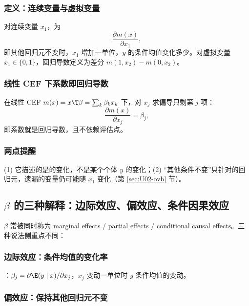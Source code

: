 \subsubsection{定义：连续变量与虚拟变量}

\begin{defn}[回归导数]\label{def:U02-deriv}
对连续变量 $x_1$，为
\[
\frac{\partial m(x)}{\partial x_1},
\]
即其他回归元不变时，$x_1$ 增加一单位，$y$ 的条件均值变化多少。对虚拟变量 $x_1\in\{0,1\}$，回归导数定义为差分 $m(1,x_2)-m(0,x_2)$。
\end{defn}

\subsubsection{线性 CEF 下系数即回归导数}

在线性 CEF $m(x)=x\T\beta=\sum_k\beta_kx_k$ 下，对 $x_j$ 求偏导只剩第 $j$ 项：
\[
\frac{\partial m(x)}{\partial x_j}=\beta_j,
\]
即系数就是回归导数，且不依赖评估点。

\subsubsection{两点提醒}

\begin{note}[回归导数的两点提醒]
(1) 它描述的是的变化，不是某个个体 $y$ 的变化；(2) “其他条件不变”只针对的回归元，遗漏的变量仍可能随 $x_1$ 变化（第 \ref{sec:U02-ovb} 节）。
\end{note}

\subsection{\texorpdfstring{$\beta$}{beta} 的三种解释：边际效应、偏效应、条件因果效应}

$\beta$ 常被同时称为 marginal effects / partial effects / conditional causal effects。三种说法侧重点不同：

\subsubsection{边际效应：条件均值的变化率}

：$\beta_j=\partial\E(y\mid x)/\partial x_j$，$x_j$ 变动一单位时 $y$ 条件均值的变动。

\subsubsection{偏效应：保持其他回归元不变}

